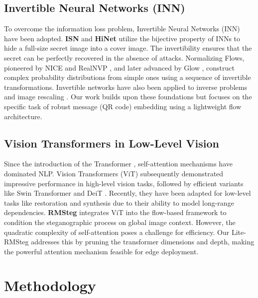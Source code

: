 \documentclass[10pt,twocolumn,letterpaper]{article}
\begin{document}
\subsection{Invertible Neural Networks (INN)}
To overcome the information loss problem, Invertible Neural Networks (INN) have been adopted. \textbf{ISN} \cite{isn} and \textbf{HiNet} \cite{hinet} utilize the bijective property of INNs to hide a full-size secret image into a cover image. The invertibility ensures that the secret can be perfectly recovered in the absence of attacks. Normalizing Flows, pioneered by NICE \cite{nice} and RealNVP \cite{realnvp}, and later advanced by Glow \cite{glow}, construct complex probability distributions from simple ones using a sequence of invertible transformations. Invertible networks have also been applied to inverse problems \cite{ardizzone_inn} and image rescaling \cite{inv_rescaling}. Our work builds upon these foundations but focuses on the specific task of robust message (QR code) embedding using a lightweight flow architecture.

\subsection{Vision Transformers in Low-Level Vision}
Since the introduction of the Transformer \cite{attention_paper}, self-attention mechanisms have dominated NLP. Vision Transformers (ViT) \cite{vit} subsequently demonstrated impressive performance in high-level vision tasks, followed by efficient variants like Swin Transformer \cite{swin} and DeiT \cite{deit}. Recently, they have been adapted for low-level tasks like restoration and synthesis due to their ability to model long-range dependencies. \textbf{RMSteg} \cite{rmsteg} integrates ViT into the flow-based framework to condition the steganographic process on global image context. However, the quadratic complexity of self-attention poses a challenge for efficiency. Our Lite-RMSteg addresses this by pruning the transformer dimensions and depth, making the powerful attention mechanism feasible for edge deployment.

\section{Methodology}
\end{document}

